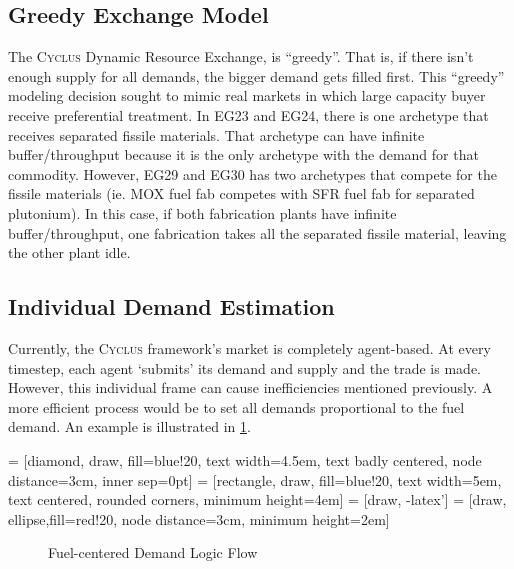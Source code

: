\documentclass{article}
\newcommand{\Cyclus}{\textsc{Cyclus}\xspace}%
\begin{document}
\subsection{Greedy Exchange Model}
The \Cyclus Dynamic Resource Exchange, is ``greedy''. That is,  if there isn't
enough supply for all demands, the bigger demand gets filled first.
This ``greedy'' modeling decision sought to mimic real markets in which large capacity
buyer receive preferential treatment. 
In EG23 and EG24,
there is one archetype that receives separated fissile materials. That archetype
can have infinite buffer/throughput because it is the only
archetype with the demand for that commodity. However, EG29 and EG30 has two archetypes
that compete for the fissile materials (ie. \gls{MOX} fuel fab competes with \gls{SFR} fuel fab for separated plutonium).
In this case, if both fabrication plants have infinite buffer/throughput, one fabrication takes all the
separated fissile material, leaving the other plant idle.


\subsection{Individual Demand Estimation}
Currently, the \Cyclus framework's market is completely agent-based. At every timestep, each agent `submits' its
demand and supply and the trade is made. However, this individual frame can cause inefficiencies mentioned previously.
A more efficient process would be to set all demands proportional to the fuel demand. An example is illustrated
in \cref{diag:hd}.

 = [diamond, draw, fill=blue!20, 
text width=4.5em, text badly centered, node distance=3cm, inner sep=0pt]
 = [rectangle, draw, fill=blue!20, 
text width=5em, text centered, rounded corners, minimum height=4em]
 = [draw, -latex']
 = [draw, ellipse,fill=red!20, node distance=3cm,
minimum height=2em]


\begin{figure}
	\centering
	\caption{Fuel-centered Demand Logic Flow}
	\label{diag:hd}
\end{figure}
 
\end{document}
